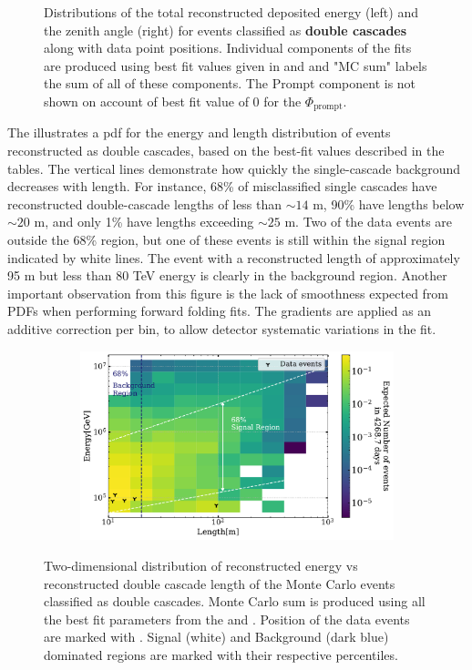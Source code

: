 \begin{figure}[h]
\begin{subfigure}[h]{0.7\textwidth}
    \end{subfigure}%
    \caption{Distributions of the total reconstructed deposited energy (left) and the zenith angle (right) for events classified as \textbf{double cascades} along with data point positions. Individual components of the fits are produced using best fit values given in  and  and "MC sum" labels the sum of all of these components. The Prompt component is not shown on account of best fit value of 0 for the $\Phi_{\mathrm{prompt}}$.}
\end{figure}
The  illustrates a pdf for the energy and length distribution of events reconstructed as double cascades, based on the best-fit values described in the tables. The vertical lines demonstrate how quickly the single-cascade background decreases with length. For instance, 68\% of misclassified single cascades have reconstructed double-cascade lengths of less than $\sim 14$ m, 90\% have lengths below $\sim  20$ m, and only 1\% have lengths exceeding $\sim 25$ m. Two of the data events are outside the 68\% region, but one of these events is still within the signal region indicated by white lines. The event with a reconstructed length of approximately 95 m but less than 80 TeV energy is clearly in the background region. Another important observation from this figure is the lack of smoothness expected from PDFs when performing forward folding fits. The gradients are applied as an additive correction per bin, to allow detector systematic variations in the fit. 
\begin{figure}[h]
    \begin{subfigure}{0.8\textwidth}
        \includegraphics{./figures/results/DataMC_IC86_pass2_SnowStorm_v2_Bfr_DoubleCascadesLvsE_2D_withData.pdf}
    \end{subfigure}
    
    \caption{Two-dimensional distribution of reconstructed energy vs reconstructed double cascade length of the Monte Carlo events classified as double cascades. Monte Carlo sum is produced using all the best fit parameters from the  and . Position of the data events are marked with \wye[rotate=180]. Signal (white) and Background (dark blue) dominated regions are marked with their respective percentiles.}
\end{figure}

